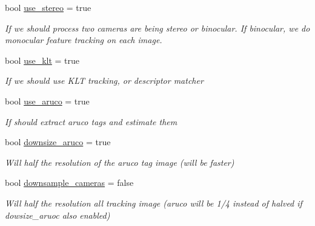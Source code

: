 \begin{DoxyCompactItemize}
bool \hyperlink{structov__msckf_1_1VioManagerOptions_af01535da59b1d2d5e3309aaa34e69c8e}{use\+\_\+stereo} = true
\begin{DoxyCompactList}\small\item\em If we should process two cameras are being stereo or binocular. If binocular, we do monocular feature tracking on each image. \end{DoxyCompactList}\item 
\mbox{\label{structov__msckf_1_1VioManagerOptions_a1885c647c47cb5216fc4b868553ec0fa}} 
bool \hyperlink{structov__msckf_1_1VioManagerOptions_a1885c647c47cb5216fc4b868553ec0fa}{use\+\_\+klt} = true
\begin{DoxyCompactList}\small\item\em If we should use K\+LT tracking, or descriptor matcher \end{DoxyCompactList}\item 
\mbox{\label{structov__msckf_1_1VioManagerOptions_a731396cbfdf81f8519981d6e4b6374fd}} 
bool \hyperlink{structov__msckf_1_1VioManagerOptions_a731396cbfdf81f8519981d6e4b6374fd}{use\+\_\+aruco} = true
\begin{DoxyCompactList}\small\item\em If should extract aruco tags and estimate them \end{DoxyCompactList}\item 
\mbox{\label{structov__msckf_1_1VioManagerOptions_afa1f6f0e1422dc41ea98c80077580c60}} 
bool \hyperlink{structov__msckf_1_1VioManagerOptions_afa1f6f0e1422dc41ea98c80077580c60}{downsize\+\_\+aruco} = true
\begin{DoxyCompactList}\small\item\em Will half the resolution of the aruco tag image (will be faster) \end{DoxyCompactList}\item 
\mbox{\label{structov__msckf_1_1VioManagerOptions_af08feea8c9e944e727483f6ff3899e8e}} 
bool \hyperlink{structov__msckf_1_1VioManagerOptions_af08feea8c9e944e727483f6ff3899e8e}{downsample\+\_\+cameras} = false
\begin{DoxyCompactList}\small\item\em Will half the resolution all tracking image (aruco will be 1/4 instead of halved if dowsize\+\_\+aruoc also enabled) \end{DoxyCompactList}\item 

\end{DoxyCompactItemize}
